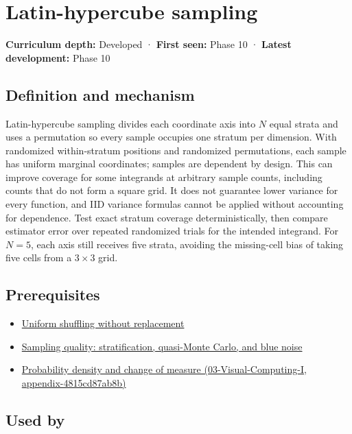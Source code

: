 \hypertarget{appendix-1c5e85693a06}{}
\section{Latin-hypercube sampling}\label{appendix-1c5e85693a06-latin-hypercube-sampling}

\textbf{Curriculum depth:} Developed · \textbf{First seen:} Phase 10 · \textbf{Latest development:} Phase 10

\subsection{Definition and mechanism}\label{appendix-1c5e85693a06-definition-and-mechanism}

Latin-hypercube sampling divides each coordinate axis into \(N\) equal strata and uses a permutation so every sample occupies one stratum per dimension. With randomized within-stratum positions and randomized permutations, each sample has uniform marginal coordinates; samples are dependent by design. This can improve coverage for some integrands at arbitrary sample counts, including counts that do not form a square grid. It does not guarantee lower variance for every function, and IID variance formulas cannot be applied without accounting for dependence. Test exact stratum coverage deterministically, then compare estimator error over repeated randomized trials for the intended integrand. For \(N=5\), each axis still receives five strata, avoiding the missing-cell bias of taking five cells from a \(3\times3\) grid.

\subsection{Prerequisites}\label{appendix-1c5e85693a06-prerequisites}

\begin{itemize}
\tightlist
\item
  \hyperref[appendix-184fcc411663]{Uniform shuffling without replacement}
\item
  \hyperref[appendix-9f693ffd82bc]{Sampling quality: stratification, quasi-Monte Carlo, and blue noise}
\item
  \href{../03-Visual-Computing-I/main.pdf\#nameddest=appendix-4815cd87ab8b}{Probability density and change of measure (03-Visual-Computing-I, appendix-4815cd87ab8b)}
\end{itemize}

\subsection{Used by}\label{appendix-1c5e85693a06-used-by}

